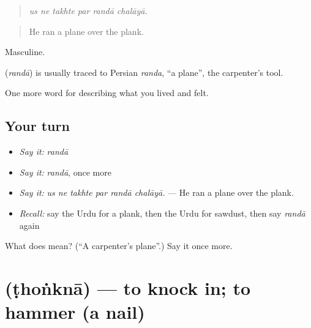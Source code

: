\begin{quote}
     
\end{quote}

\begin{quote}
\emph{us ne takhte par randā chalāyā.}
\end{quote}

\begin{quote}
He ran a plane over the plank.
\end{quote}

Masculine.

\begin{cousinweb}
\textbf{} (\emph{randā}) is usually traced to Persian \emph{randa}, \textquotedblleft{}a plane\textquotedblright{}, the carpenter's tool.
\end{cousinweb}

\begin{grammarlens}[title={What you've built}]
One more word for describing what you lived and felt.
\end{grammarlens}

\subsection*{Your turn}
\begin{itemize}
\raggedright
  \item \emph{Say it:} \emph{randā}
  \item \emph{Say it:} \emph{randā}, once more
  \item \emph{Say it:} \emph{us ne takhte par randā chalāyā.} — He ran a plane over the plank.
  \item \emph{Recall:} say the Urdu for a plank, then the Urdu for sawdust, then say \emph{randā} again
\end{itemize}

\begin{tcolorbox}[breakable,colback=teal!4,colframe=teal!35!black,title={Before you move on}]
What does  mean? (\textquotedblleft{}A carpenter's plane\textquotedblright{}.) Say it once more.
\end{tcolorbox}
\section[\texorpdfstring{\ur{ٹھونکنا} (ṭhoṅknā)}{ٹھونکنا (ṭhoṅknā)}]{ (ṭhoṅknā) — to knock in; to hammer (a nail)}

\label{lesson:UR-C497-thonkna}



